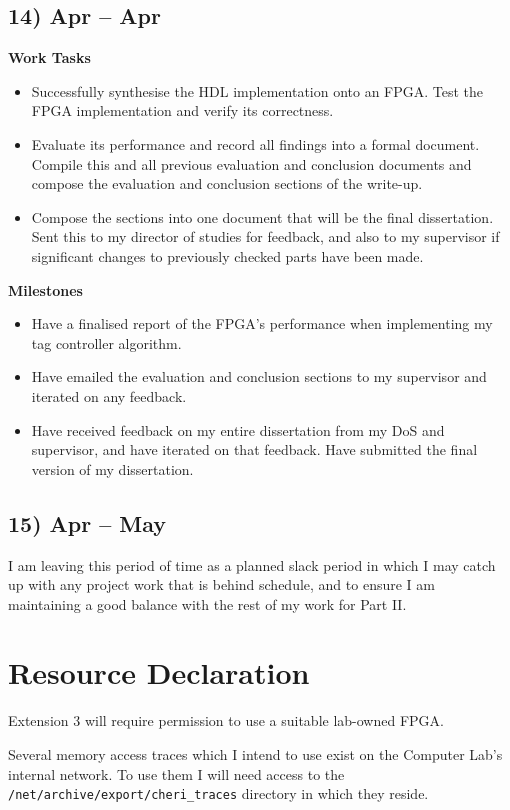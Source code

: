 \documentclass[10pt,a4paper]{article}
\begin{document}
\subsection*{14)  Apr --  Apr}
\textbf{Work Tasks}
\begin{itemize}
	\item Successfully synthesise the HDL implementation onto an FPGA. Test the FPGA implementation and verify its correctness.
	\item Evaluate its performance and record all findings into a formal document. Compile this and all previous evaluation and conclusion documents and compose the evaluation and conclusion sections of the write-up.
	\item Compose the sections into one document that will be the final dissertation. Sent this to my director of studies for feedback, and also to my supervisor if significant changes to previously checked parts have been made.
\end{itemize}

\textbf{Milestones}
\begin{itemize}
	\item Have a finalised report of the FPGA's performance when implementing my tag controller algorithm.
	\item Have emailed the evaluation and conclusion sections to my supervisor and iterated on any feedback.
	\item Have received feedback on my entire dissertation from my DoS and supervisor, and have iterated on that feedback. Have submitted the final version of my dissertation.
\end{itemize}

\subsection*{15)  Apr --  May}
I am leaving this period of time as a planned slack period in which I may catch up with any project work that is behind schedule, and to ensure I am maintaining a good balance with the rest of my work for Part II.

\section*{Resource Declaration}

Extension 3 will require permission to use a suitable lab-owned FPGA. 

Several memory access traces which I intend to use exist on the Computer Lab’s internal network. To use them I will need access to the \texttt{/net/archive/export/cheri\_traces} directory in which they reside.
\end{document}
